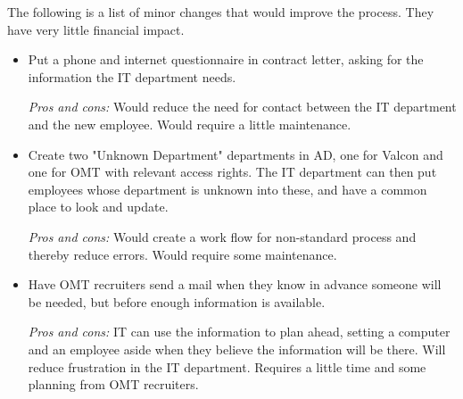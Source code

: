 The following is a list of minor changes that would improve the process.
They have very little financial impact.
\begin{itemize}
\item Put a phone and internet questionnaire in contract letter, asking for the information the IT department needs.

\emph{Pros and cons:} Would reduce the need for contact between the IT department and the new employee.
Would require a little maintenance.

\item Create two "Unknown Department" departments in AD, one for Valcon and one for OMT with relevant access rights. The IT department can then put employees whose department is unknown into these, and have a common place to look and update.

\emph{Pros and cons:} Would create a work flow for non-standard process and thereby reduce errors. Would require some maintenance.

\item Have OMT recruiters send a mail when they know in advance someone will be needed, but before enough information is available.

\emph{Pros and cons:} IT can use the information to plan ahead, setting a computer and an employee aside when they believe the information will be there. Will reduce frustration in the IT department. Requires a little time and some planning from OMT recruiters.
\end{itemize}
